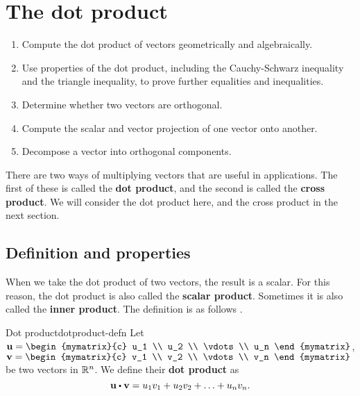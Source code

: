 \section{The dot product}

\begin{outcome}
  \begin{enumerate}
  \item Compute the dot product of vectors geometrically and
    algebraically.
  \item Use properties of the dot product, including the
    Cauchy-Schwarz inequality and the triangle inequality, to prove
    further equalities and inequalities.
  \item Determine whether two vectors are orthogonal.
  \item Compute the scalar and vector projection of one vector onto
    another.
  \item Decompose a vector into orthogonal components.
  \end{enumerate}
\end{outcome}

There are two ways of multiplying vectors that are useful in
applications. The first of these is called the \textbf{dot product},
and the second is called the \textbf{cross product}. We will consider
the dot product here, and the cross product in the next section.

\subsection{Definition and properties}

When we take the dot product of two vectors, the result is a
scalar. For this reason, the dot product is also called the
\textbf{scalar product}. Sometimes it is also called the \textbf{inner
  product}. The definition is as follows%
%
%
.

\begin{definition}{Dot product}{dotproduct-defn}
  Let $\vect{u}=\begin{mymatrix}{c}
    u_1 \\
    u_2 \\
    \vdots \\
    u_n 
  \end{mymatrix}$, $\vect{v}= \begin{mymatrix}{c}
    v_1 \\
    v_2 \\
    \vdots \\
    v_n 
  \end{mymatrix}$ be two vectors in $\mathbb{R}^{n}$. We
  define their \textbf{dot product} as
  \begin{equation*}
    \vect{u}\dotprod \vect{v} = u_1v_1+u_2v_2+\ldots+u_nv_n.
  \end{equation*}
\end{definition}

